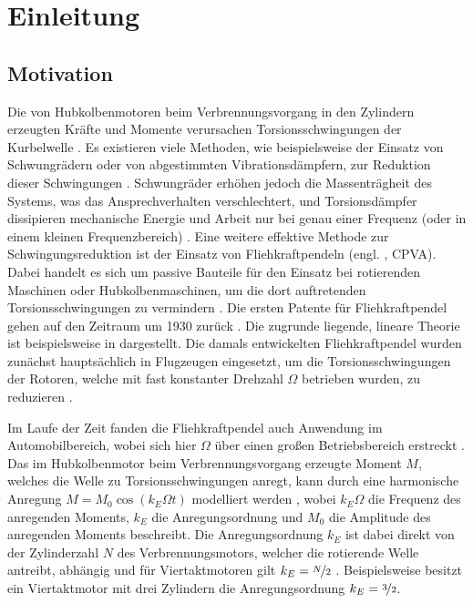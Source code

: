 \chapter{Einleitung}



\section{Motivation} \label{sec:Einl:Motivation}


Die von Hubkolbenmotoren beim Verbrennungsvorgang in den Zylindern erzeugten Kräfte und Momente 
verursachen Torsionsschwingungen der Kurbelwelle \cite{Denman:Tautochronic}.
Es existieren viele Methoden, wie beispielsweise der Einsatz von
Schwungrädern oder von abgestimmten Vibrationsdämpfern, zur Reduktion dieser Schwingungen \cite{ALSUWAIYAN:2002:PerformanceAnd}.
Schwungräder erhöhen jedoch  die Massenträgheit des Systems, was das Ansprechverhalten verschlechtert,
und Torsionsdämpfer dissipieren mechanische Energie und Arbeit 
nur bei genau einer Frequenz (oder in einem kleinen Frequenzbereich)
\cite{ALSUWAIYAN:2002:PerformanceAnd}.
Eine weitere effektive Methode zur Schwingungsreduktion ist der Einsatz von
Fliehkraftpendeln (engl. , CPVA).
Dabei handelt es sich um passive Bauteile für den Einsatz bei rotierenden Maschinen oder
Hubkolbenmaschinen, um die dort auftretenden Torsionsschwingungen zu vermindern \cite{monroe2011accounting}.
Die ersten Patente für Fliehkraftpendel gehen auf den Zeitraum um 1930 zurück
\cite{Sarazin:1931:Patent}. 
Die zugrunde liegende, lineare Theorie ist beispielsweise in 
\cite{Desoyer-Slibar:1953:BerechnungVonPendelTilgern,  Paslay:Slibar:1956:OptAusSalomonTilger, 
Schick:1939:WirkungFliehkraftpendel, Slibar-Desoyer:1954:ZurErzielungOptimaler}
dargestellt.
Die damals entwickelten Fliehkraftpendel wurden zunächst hauptsächlich in Flugzeugen eingesetzt, um die
Torsionsschwingungen der Rotoren, welche mit fast konstanter Drehzahl $\Omega$ betrieben wurden,
zu reduzieren \cite{Vidmar:Feeney:2012:CoulombFriction}. 

Im Laufe der Zeit fanden die Fliehkraftpendel auch Anwendung im Automobilbereich,
wobei sich hier $\Omega$ über einen großen Betriebsbereich erstreckt 
\cite{Vidmar:Feeney:2012:CoulombFriction}.
Das im Hubkolbenmotor beim Verbrennungsvorgang erzeugte Moment $M$, welches die Welle zu Torsionsschwingungen anregt, 
kann durch eine harmonische Anregung $M=M_0 \cos(k_E \Omega t)$ modelliert werden \cite{Denman:Tautochronic},
wobei $k_E \Omega$ die Frequenz des anregenden Moments, $k_E$ die  Anregungsordnung und $M_0$ die 
Amplitude des anregenden Moments beschreibt. 
Die Anregungsordnung  $k_E$ ist dabei direkt von der Zylinderzahl $N$ des Verbrennungsmotors,
welcher die  rotierende Welle antreibt,  abhängig
und für  Viertaktmotoren gilt $k_E=\nicefrac{N}{2}$ \cite{Denman:Tautochronic}.
Beispielsweise besitzt ein Viertaktmotor mit drei Zylindern die Anregungsordnung $k_E = \nicefrac{3}{2}$. 

